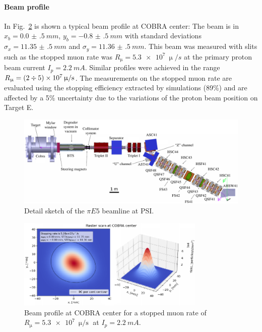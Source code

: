 \begin{refsection}
        \paragraph{Beam profile}
        In Fig.~\ref{fig:meg:beamprofile} is shown a typical beam profile at COBRA center: The beam is in $x_b = \SI{0.0(5)}{mm}$, $y_b = \SI{-0.8(5)}{mm}$ with standard deviations $\sigma_x = \SI{11.35(50)}{mm}$ and $\sigma_y = \SI{11.36(50)}{mm}$. 
        This beam was measured with slits such as the stopped muon rate was $R_\upmu = \SI{5.3e7}{\upmu \per s}$ at the primary proton beam current $I_p = \SI{2.2}{mA}$. 
        Similar profiles were achieved in the range $R_\upmu = (2 \divisionsymbol 5) \times \SI{e7}{\upmu \per s}$.
        The measurements on the stopped muon rate are evaluated using the stopping efficiency extracted by simulations (89\%) and are affected by a 5\% uncertainty due to the variations of the proton beam position on Target E.

        \begin{figure}
            \centering
            \includegraphics[width = \textwidth]{Figures/MEG/piE5_beamline.png}
            \caption{Detail sketch of the $\pi E5$ beamline at PSI.}
            \label{fig:pie5}
        \end{figure}
        
        \begin{figure}
            \centering
            \includegraphics[width = 0.8\textwidth]{Figures/MEG/meg_beamprofile.png}
            \caption{Beam profile at COBRA center for a stopped muon rate of $R_\upmu = \SI{5.3e7}{\upmu \per \second}$ at $I_p = \SI{2.2}{mA}$.}
            \label{fig:meg:beamprofile}
        \end{figure}


\end{refsection}
